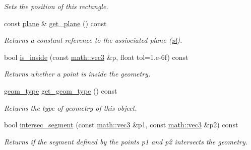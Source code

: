 \begin{DoxyCompactItemize}
\begin{DoxyCompactList}\small\item\em Sets the position of this rectangle. \end{DoxyCompactList}\item 
\mbox{\label{classphysim_1_1geom_1_1rectangle_a1344fcc96a75ecb11de969658667ffbf}} 
const \hyperlink{classphysim_1_1geom_1_1plane}{plane} \& \hyperlink{classphysim_1_1geom_1_1rectangle_a1344fcc96a75ecb11de969658667ffbf}{get\+\_\+plane} () const
\begin{DoxyCompactList}\small\item\em Returns a constant reference to the assiociated plane (\hyperlink{classphysim_1_1geom_1_1rectangle_aaf289e8860e9cd816d3ea93da2adde9a}{pl}). \end{DoxyCompactList}\item 
bool \hyperlink{classphysim_1_1geom_1_1rectangle_a58c9d1adb350b5c140069ff920a2a2b0}{is\+\_\+inside} (const \hyperlink{structphysim_1_1math_1_1vec3}{math\+::vec3} \&p, float tol=1.e-\/6f) const
\begin{DoxyCompactList}\small\item\em Returns whether a point is inside the geometry. \end{DoxyCompactList}\item 
\mbox{\label{classphysim_1_1geom_1_1rectangle_ae545bf770de9cdde166e384d4ae043d1}} 
\hyperlink{namespacephysim_1_1geom_a473d69ab4667a730784b37b67fa4b658}{geom\+\_\+type} \hyperlink{classphysim_1_1geom_1_1rectangle_ae545bf770de9cdde166e384d4ae043d1}{get\+\_\+geom\+\_\+type} () const
\begin{DoxyCompactList}\small\item\em Returns the type of geometry of this object. \end{DoxyCompactList}\item 
bool \hyperlink{classphysim_1_1geom_1_1rectangle_acdc3e93ccf70772aa42729773ef63345}{intersec\+\_\+segment} (const \hyperlink{structphysim_1_1math_1_1vec3}{math\+::vec3} \&p1, const \hyperlink{structphysim_1_1math_1_1vec3}{math\+::vec3} \&p2) const
\begin{DoxyCompactList}\small\item\em Returns if the segment defined by the points {\itshape p1} and {\itshape p2} intersects the geometry. \end{DoxyCompactList}\item 

\end{DoxyCompactItemize}
